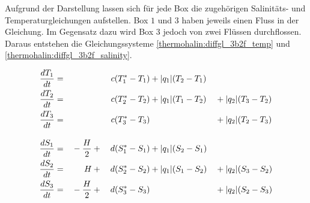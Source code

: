 Aufgrund der Darstellung lassen sich für jede Box die zugehörigen Salinitäts- und Temperaturgleichungen aufstellen. Box $1$ und $3$ haben jeweils einen Fluss in der Gleichung. Im Gegensatz dazu wird Box $3$ jedoch von zwei Flüssen durchflossen. Daraus entstehen die Gleichungssysteme \ref{thermohalin:diffgl_3b2f_temp} und \ref{thermohalin:diffgl_3b2f_salinity}. 

\begin{alignat}{4}
\def\arraystretch{1.3}
\displaystyle
\frac{dT_1}{dt} &=&                           & &c(T_1^*-T_1) &+|q_1|(T_2-T_1)  &&
\notag
\\
\displaystyle
\frac{dT_2}{dt} &=&                           & &c(T_2^*-T_2) &+|q_1|(T_1-T_2)  &&+|q_2|(T_3-T_2)
\label{thermohalin:diffgl_3b2f_temp}
\\
\displaystyle
\frac{dT_3}{dt} &=&                           & &c(T_3^*-T_3) &                 &&+|q_2|(T_2-T_3)
\notag
\\[10pt]
\displaystyle
\frac{dS_1}{dt} &=&\displaystyle \mathstrut-\frac{H}{2} &\mathstrut+\mathstrut&d(S_1^*-S_1) &+ |q_1|(S_2-S_1) && 
\notag
\\
\displaystyle
\frac{dS_2}{dt} &=&           H               &\mathstrut+\mathstrut&d(S_2^*-S_2) &+ |q_1|(S_1-S_2) &&+ |q_2|(S_3-S_2)	
\label{thermohalin:diffgl_3b2f_salinity}
\\
\displaystyle
\frac{dS_3}{dt} &=&\displaystyle \mathstrut-\frac{H}{2} &\mathstrut+\mathstrut&d(S_3^*-S_3) &                &&+ |q_2|(S_2-S_3)
\notag
\end{alignat}
